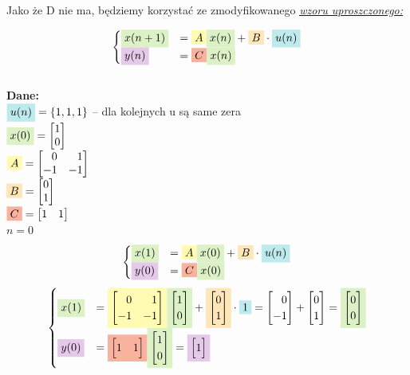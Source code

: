 \documentclass[12pt]{scrartcl}
\newcommand{\link}[2]{
	\hyperref[#1]{\textit{\underline{#2}}}
}
\newcommand{\macierz}[1]{\begin{bmatrix}#1\end{bmatrix}}
\newcommand{\bgcolor}[2]{\colorbox{#1!30}{#2}}
\newcommand{\rownaniezmacierzax}[5]{
	\bgcolor{YellowGreen}{#1} &= \bgcolor{Yellow}{#2}\bgcolor{YellowGreen}{#3} + \bgcolor{Dandelion}{#4}\cdot\bgcolor{Turquoise}{#5}
}
\newcommand{\rownaniezmacierzaysimple}[3]{
	\bgcolor{Orchid}{#1} &= \bgcolor{Red}{#2}\bgcolor{YellowGreen}{#3}
}
\newcommand{\m}{\phantom{-}}
\begin{document}
Jako że D nie ma, będziemy korzystać ze zmodyfikowanego \link{eq:rownanie_stanu_uproszczone}{wzoru uproszczonego:}

$$
	\begin{cases}
		\rownaniezmacierzax{$x(n+1)$}{$A$}{$x(n)$}{$B$}{$u(n)$}\\
		\rownaniezmacierzaysimple{$y(n)$}{$C$}{$x(n)$}
	\end{cases}
$$
\\

\textbf{Dane:}\\

$\bgcolor{Turquoise}{$u(n)$}=\{1, 1, 1\}$ -- dla kolejnych u są same zera\\
$\bgcolor{YellowGreen}{$x(0)$}=\begin{bmatrix}1\\ 0\end{bmatrix}$\\
$\bgcolor{Yellow}{$A$} = \vA$\\
$\bgcolor{Dandelion}{$B$} = \begin{bmatrix}0 \\ 1 \end{bmatrix}$\\
$\bgcolor{Red}{$C$} = \begin{bmatrix}1 & 1 \end{bmatrix}$\\

$n=0$\\
$$
\begin{cases}
	\rownaniezmacierzax{$x(1)$}{$A$}{$x(0)$}{$B$}{$u(n)$}\\
	\rownaniezmacierzaysimple{$y(0)$}{$C$}{$x(0)$}
\end{cases}
$$
$$
\begin{cases}
	\rownaniezmacierzax{$x(1)$}
	{$\vA$}							%
	{$\macierz{1 \\ 0}$}			%
	{$\macierz{0 \\ 1}$}			%
	{1}								%
	=\macierz{\m0 \\ -1} + \macierz{0 \\ 1}
	=\bgcolor{YellowGreen}{$\macierz{0 \\ 0}$}\\
	
	\rownaniezmacierzaysimple{$y(0)$}
	{$\macierz{1 & 1}$}				%
	{$\macierz{1 \\ 0}$}			%
	= \bgcolor{Orchid}{$\macierz{1}$}
\end{cases}
$$\\
\end{document}
